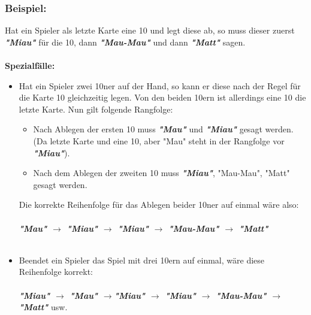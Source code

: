 \documentclass{article}
\begin{document}
\subsubsection*{Beispiel:}
Hat ein Spieler als letzte Karte eine 10 und legt diese ab, so muss dieser zuerst \textit{\textbf{"Miau"}} für die 10, dann \textbf{\textit{"Mau-Mau"}} und dann \textit{\textbf{"Matt"}} sagen. \\ \\
\textbf{Spezialfälle:}
\begin{itemize}
\item Hat ein Spieler zwei 10ner auf der Hand, so kann er diese nach der Regel für die Karte 10 gleichzeitig legen. Von den beiden 10ern ist allerdings eine 10 die letzte Karte. Nun gilt folgende Rangfolge: \\
\begin{itemize}
\item Nach Ablegen der ersten 10 muss \textit{\textbf{"Mau"}} und \textit{\textbf{"Miau"}} gesagt werden. (Da letzte Karte und eine 10, aber "Mau" steht in der Rangfolge vor \textit{\textbf{"Miau"}}).
\item Nach dem Ablegen der zweiten 10 muss \textit{\textbf{"Miau"}}, "Mau-Mau", "Matt" gesagt werden.
\end{itemize}
Die korrekte Reihenfolge für das Ablegen beider 10ner auf einmal wäre also: \\ \\
\textit{\textbf{"Mau" $\rightarrow$ "Miau" $\rightarrow$ "Miau" $\rightarrow$ "Mau-Mau" $\rightarrow$ "Matt"}} \\ \\
        
\item Beendet ein Spieler das Spiel mit drei 10ern auf einmal, wäre diese Reihenfolge korrekt: \\ \\  
       \textit{\textbf{"Miau" $\rightarrow$ "Mau" $\rightarrow$"Miau" $\rightarrow$ "Miau" $\rightarrow$ "Mau-Mau" $\rightarrow$ "Matt"}} usw.
\end{itemize}
\end{document}
